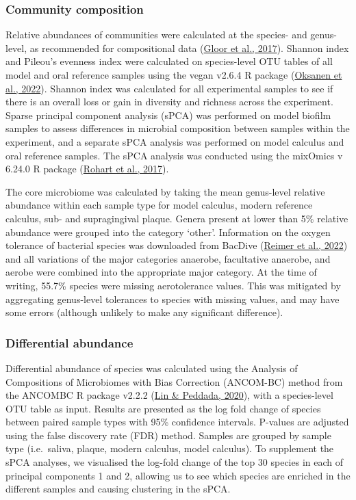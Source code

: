 \documentclass[
  b5paper,
]{book}
\begin{document}
\hypertarget{community-composition}{%
\subsubsection{Community composition}\label{community-composition}}

Relative abundances of communities were calculated at the species- and
genus-level, as recommended for compositional data
(\protect\hyperlink{ref-gloorMicrobiomeDatasets2017}{Gloor et al.,
2017}). Shannon index and Pileou's evenness index were calculated on
species-level OTU tables of all model and oral reference samples using
the vegan v2.6.4 R package (\protect\hyperlink{ref-Rvegan}{Oksanen et
al., 2022}). Shannon index was calculated for all experimental samples
to see if there is an overall loss or gain in diversity and richness
across the experiment. Sparse principal component analysis (sPCA) was
performed on model biofilm samples to assess differences in microbial
composition between samples within the experiment, and a separate sPCA
analysis was performed on model calculus and oral reference samples. The
sPCA analysis was conducted using the mixOmics v 6.24.0 R package
(\protect\hyperlink{ref-RmixOmics}{Rohart et al., 2017}).

The core microbiome was calculated by taking the mean genus-level
relative abundance within each sample type for model calculus, modern
reference calculus, sub- and supragingival plaque. Genera present at
lower than 5\% relative abundance were grouped into the category
`other'. Information on the oxygen tolerance of bacterial species was
downloaded from BacDive
(\protect\hyperlink{ref-reimerBacDive2022}{Reimer et al., 2022}) and all
variations of the major categories anaerobe, facultative anaerobe, and
aerobe were combined into the appropriate major category. At the time of
writing, 55.7\% species were missing aerotolerance values. This was
mitigated by aggregating genus-level tolerances to species with missing
values, and may have some errors (although unlikely to make any
significant difference).

\hypertarget{differential-abundance}{%
\subsubsection{Differential abundance}\label{differential-abundance}}

Differential abundance of species was calculated using the Analysis of
Compositions of Microbiomes with Bias Correction (ANCOM-BC) method from
the ANCOMBC R package v2.2.2 (\protect\hyperlink{ref-linANCOMBC2020}{Lin
\& Peddada, 2020}), with a species-level OTU table as input. Results are
presented as the log fold change of species between paired sample types
with 95\% confidence intervals. P-values are adjusted using the false
discovery rate (FDR) method. Samples are grouped by sample type
(i.e.~saliva, plaque, modern calculus, model calculus). To supplement
the sPCA analyses, we visualised the log-fold change of the top 30
species in each of principal components 1 and 2, allowing us to see
which species are enriched in the different samples and causing
clustering in the sPCA.
\end{document}
